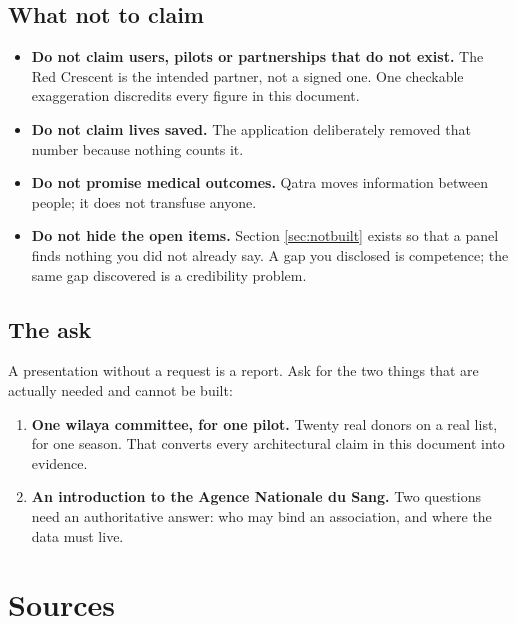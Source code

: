 \documentclass[11pt,a4paper]{article}
\begin{document}
\subsection{What not to claim}

\begin{itemize}[leftmargin=1.4em]
  \item \textbf{Do not claim users, pilots or partnerships that do not exist.}
        The Red Crescent is the intended partner, not a signed one. One
        checkable exaggeration discredits every figure in this document.
  \item \textbf{Do not claim lives saved.} The application deliberately removed
        that number because nothing counts it.
  \item \textbf{Do not promise medical outcomes.} Qatra moves information
        between people; it does not transfuse anyone.
  \item \textbf{Do not hide the open items.} Section \ref{sec:notbuilt} exists
        so that a panel finds nothing you did not already say. A gap you
        disclosed is competence; the same gap discovered is a credibility
        problem.
\end{itemize}

\subsection{The ask}

A presentation without a request is a report. Ask for the two things that are
actually needed and cannot be built:

\begin{enumerate}[leftmargin=1.4em]
  \item \textbf{One wilaya committee, for one pilot.} Twenty real donors on a
        real list, for one season. That converts every architectural claim in
        this document into evidence.
  \item \textbf{An introduction to the Agence Nationale du Sang.} Two questions
        need an authoritative answer: who may bind an association, and where
        the data must live.
\end{enumerate}

\section{Sources}
\end{document}
